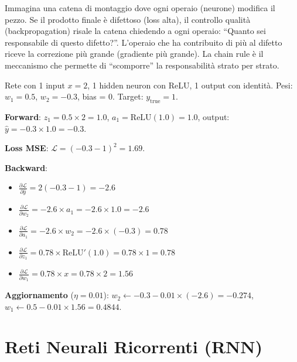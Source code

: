 \documentclass[12pt,a4paper]{article}
\begin{document}
\begin{notabox}
Immagina una catena di montaggio dove ogni operaio (neurone) modifica il pezzo. Se il prodotto finale \`e difettoso (loss alta), il controllo qualit\`a (backpropagation) risale la catena chiedendo a ogni operaio: ``Quanto sei responsabile di questo difetto?''. L'operaio che ha contribuito di pi\`u al difetto riceve la correzione pi\`u grande (gradiente pi\`u grande). La chain rule \`e il meccanismo che permette di ``scomporre'' la responsabilit\`a strato per strato.
\end{notabox}

\begin{examplebox}
Rete con 1 input $x = 2$, 1 hidden neuron con ReLU, 1 output con identit\`a. Pesi: $w_1 = 0.5$, $w_2 = -0.3$, bias = 0. Target: $y_{\text{true}} = 1$.

\textbf{Forward}: $z_1 = 0.5 \times 2 = 1.0$, $a_1 = \text{ReLU}(1.0) = 1.0$, output: $\hat{y} = -0.3 \times 1.0 = -0.3$.

\textbf{Loss MSE}: $\mathcal{L} = (-0.3 - 1)^2 = 1.69$.

\textbf{Backward}:
\begin{itemize}
    \item $\frac{\partial \mathcal{L}}{\partial \hat{y}} = 2(-0.3 - 1) = -2.6$
    \item $\frac{\partial \mathcal{L}}{\partial w_2} = -2.6 \times a_1 = -2.6 \times 1.0 = -2.6$
    \item $\frac{\partial \mathcal{L}}{\partial a_1} = -2.6 \times w_2 = -2.6 \times (-0.3) = 0.78$
    \item $\frac{\partial \mathcal{L}}{\partial z_1} = 0.78 \times \text{ReLU}'(1.0) = 0.78 \times 1 = 0.78$
    \item $\frac{\partial \mathcal{L}}{\partial w_1} = 0.78 \times x = 0.78 \times 2 = 1.56$
\end{itemize}

\textbf{Aggiornamento} ($\eta = 0.01$): $w_2 \leftarrow -0.3 - 0.01 \times (-2.6) = -0.274$, $w_1 \leftarrow 0.5 - 0.01 \times 1.56 = 0.4844$.
\end{examplebox}



\newpage
\section{Reti Neurali Ricorrenti (RNN)} \label{app:rnn}
\end{document}
